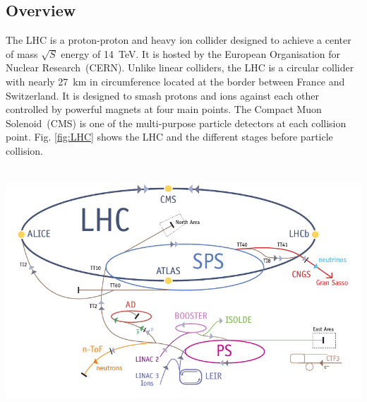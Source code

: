 \subsection{Overview}
The LHC is a proton-proton and heavy ion collider designed to achieve a center of mass $\displaystyle{\sqrt{S}}$ energy of 14~TeV. It is hosted by the European Organisation for Nuclear Research~(CERN). Unlike linear colliders, the LHC is a circular collider with nearly 27~km in circumference located at the border between France and Switzerland. It is designed to smash protons and ions against each other controlled by powerful magnets at four main points. The Compact Muon Solenoid~(CMS) is one of the multi-purpose particle detectors at each collision point.
Fig. \ref{fig:LHC} shows the LHC and the different stages before particle collision.%
\begin{center}
\centering
\mbox{
\includegraphics[width=6in]{THESISPLOTS/The_LHC.png}}
\label{fig:LHC}
\end{center}
